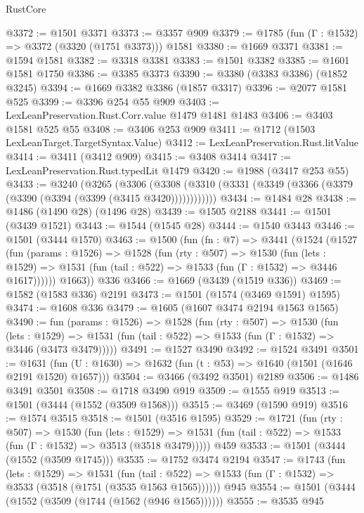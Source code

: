 \begin{lexlean}{RustCore}
\begin{coremodule}
@3372 := @1501 @3371
@3373 := @3357 @909
@3379 := @1785 (fun (Γ : @1532) => @3372 (@3320 (@1751 @3373))) @1581
@3380 := @1669 @3371
@3381 := @1594 @1581
@3382 := @3318 @3381
@3383 := @1501 @3382
@3385 := @1601 @1581 @1750
@3386 := @3385 @3373
@3390 := @3380 (@3383 @3386) (@1852 @3245)
@3394 := @1669 @3382 @3386 (@1857 @3317)
@3396 := @2077 @1581 @525
@3399 := @3396 @254 @55 @909
@3403 := LexLeanPreservation.Rust.Corr.value @1479 @1481 @1483
@3406 := @3403 @1581 @525 @55
@3408 := @3406 @253 @909
@3411 := @1712 (@1503 LexLeanTarget.TargetSyntax.Value)
@3412 := LexLeanPreservation.Rust.litValue
@3414 := @3411 (@3412 @909)
@3415 := @3408 @3414
@3417 := LexLeanPreservation.Rust.typedLit @1479
@3420 := @1988 (@3417 @253 @55)
@3433 := @3240
    (@3265
      (@3306 (@3308 (@3310 (@3331 (@3349 (@3366 (@3379 (@3390 (@3394 (@3399 (@3415 @3420))))))))))))
@3434 := @1484 @28
@3438 := @1486 (@1490 @28) (@1496 @28)
@3439 := @1505 @2188
@3441 := @1501 (@3439 @1521)
@3443 := @1544 (@1545 @28)
@3444 := @1540 @3443
@3446 := @1501 (@3444 @1570)
@3463 := @1500
    (fun (fn : @7) =>
    @3441
      (@1524
        (@1527
          (fun (params : @1526) =>
          @1528
            (fun (rty : @507) =>
            @1530
              (fun (lets : @1529) =>
              @1531 (fun (tail : @522) => @1533 (fun (Γ : @1532) => @3446 @1617))))))
        @1663))
    @336
@3466 := @1669 (@3439 (@1519 @336))
@3469 := @1582 (@1583 @336) @2191
@3473 := @1501 (@1574 (@3469 @1591) @1595)
@3474 := @1608 @336
@3479 := @1605 (@1607 @3474 @2194 @1563 @1565)
@3490 := fun (params : @1526) =>
  @1528
    (fun (rty : @507) =>
    @1530
      (fun (lets : @1529) =>
      @1531 (fun (tail : @522) => @1533 (fun (Γ : @1532) => @3446 (@3473 @3479)))))
@3491 := @1527 @3490
@3492 := @1524 @3491
@3501 := @1631 (fun (U : @1630) => @1632 (fun (t : @53) => @1640 (@1501 (@1646 @2191 @1520) @1657)))
@3504 := @3466 (@3492 @3501) @2189
@3506 := @1486 @3491 @3501
@3508 := @1718 @3490 @919
@3509 := @1555 @919
@3513 := @1501 (@3444 (@1552 (@3509 @1568)))
@3515 := @3469 (@1590 @919)
@3516 := @1574 @3515
@3518 := @1501 (@3516 @1595)
@3529 := @1721
    (fun (rty : @507) =>
    @1530
      (fun (lets : @1529) =>
      @1531 (fun (tail : @522) => @1533 (fun (Γ : @1532) => @3513 (@3518 @3479)))))
    @459
@3533 := @1501 (@3444 (@1552 (@3509 @1745)))
@3535 := @1752 @3474 @2194
@3547 := @1743
    (fun (lets : @1529) =>
    @1531
      (fun (tail : @522) => @1533 (fun (Γ : @1532) => @3533 (@3518 (@1751 (@3535 @1563 @1565))))))
    @945
@3554 := @1501 (@3444 (@1552 (@3509 (@1744 (@1562 (@946 @1565))))))
@3555 := @3535 @945

\end{coremodule}
\end{lexlean}
